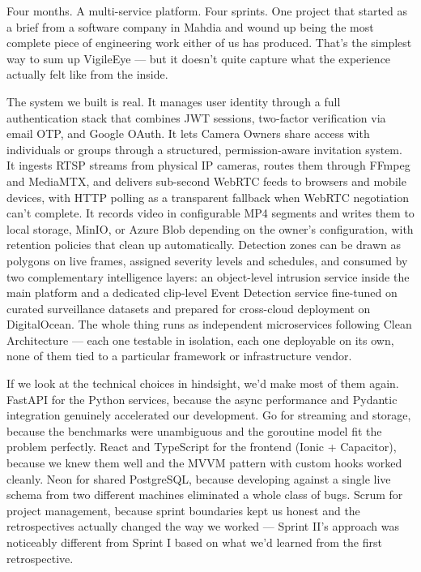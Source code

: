 \documentclass[12pt,a4paper,oneside]{report}
\begin{document}
\hspace{0.8cm}Four months. A multi-service platform. Four sprints. One project that started as a brief from a software company in Mahdia and wound up being the most complete piece of engineering work either of us has produced. That's the simplest way to sum up VigileEye — but it doesn't quite capture what the experience actually felt like from the inside.

\hspace{0.8cm}The system we built is real. It manages user identity through a full authentication stack that combines JWT sessions, two-factor verification via email OTP, and Google OAuth. It lets Camera Owners share access with individuals or groups through a structured, permission-aware invitation system. It ingests RTSP streams from physical IP cameras, routes them through FFmpeg and MediaMTX, and delivers sub-second WebRTC feeds to browsers and mobile devices, with HTTP polling as a transparent fallback when WebRTC negotiation can't complete. It records video in configurable MP4 segments and writes them to local storage, MinIO, or Azure Blob depending on the owner's configuration, with retention policies that clean up automatically. Detection zones can be drawn as polygons on live frames, assigned severity levels and schedules, and consumed by two complementary intelligence layers: an object-level intrusion service inside the main platform and a dedicated clip-level Event Detection service fine-tuned on curated surveillance datasets and prepared for cross-cloud deployment on DigitalOcean. The whole thing runs as independent microservices following Clean Architecture — each one testable in isolation, each one deployable on its own, none of them tied to a particular framework or infrastructure vendor.

\hspace{0.8cm}If we look at the technical choices in hindsight, we'd make most of them again. FastAPI for the Python services, because the async performance and Pydantic integration genuinely accelerated our development. Go for streaming and storage, because the benchmarks were unambiguous and the goroutine model fit the problem perfectly. React and TypeScript for the frontend (Ionic + Capacitor), because we knew them well and the MVVM pattern with custom hooks worked cleanly. Neon for shared PostgreSQL, because developing against a single live schema from two different machines eliminated a whole class of bugs. Scrum for project management, because sprint boundaries kept us honest and the retrospectives actually changed the way we worked — Sprint II's approach was noticeably different from Sprint I based on what we'd learned from the first retrospective.
\end{document}
